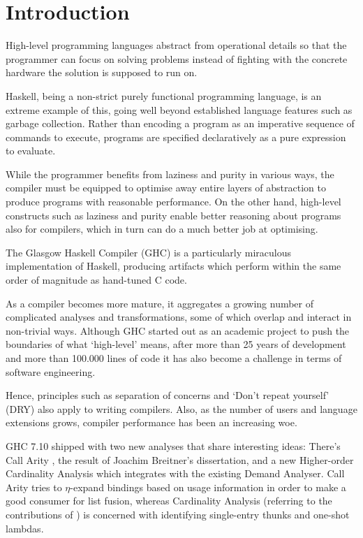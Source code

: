 \chapter{Introduction}\label{sec:intro}

High-level programming languages abstract from operational details so that the programmer can focus on solving problems instead of fighting with the concrete hardware the solution is supposed to run on.

Haskell, being a non-strict purely functional programming language, is an extreme example of this, going well beyond established language features such as garbage collection.
Rather than encoding a program as an imperative sequence of commands to execute, programs are specified declaratively as a pure expression to evaluate.

While the programmer benefits from laziness and purity in various ways, the compiler must be equipped to optimise away entire layers of abstraction to produce programs with reasonable performance.
On the other hand, high-level constructs such as laziness and purity enable better reasoning about programs also for compilers, which in turn can do a much better job at optimising.

The Glasgow Haskell Compiler (GHC) is a particularly miraculous implementation of Haskell, producing artifacts which perform within the same order of magnitude as hand-tuned C code.

As a compiler becomes more mature, it aggregates a growing number of complicated analyses and transformations, some of which overlap and interact in non-trivial ways.
Although GHC started out as an academic project to push the boundaries of what `high-level' means, after more than 25 years of development and more than 100.000 lines of code it has also become a challenge in terms of software engineering.

Hence, principles such as separation of concerns and `Don't repeat yourself' (DRY) also apply to writing compilers.
Also, as the number of users and language extensions grows, compiler performance has been an increasing woe.

GHC 7.10 shipped with two new analyses that share interesting ideas: 
There's Call Arity \parencite{callarity}, the result of Joachim Breitner's dissertation, and a new Higher-order Cardinality Analysis \parencite{card} which integrates with the existing Demand Analyser.
Call Arity tries to $\eta$-expand bindings based on usage information in order to make  a good consumer for list fusion, whereas Cardinality Analysis (referring to the contributions of \parencite{card}) is concerned with identifying single-entry thunks and one-shot lambdas.

